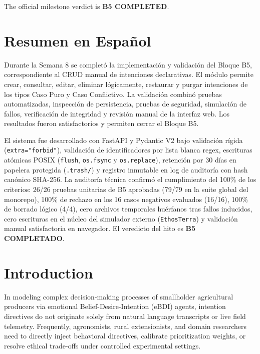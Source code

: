 \documentclass[11pt,a4paper]{article}
\begin{document}
The official milestone verdict is \textbf{B5 COMPLETED}.

\section{Resumen en Español}

Durante la Semana 8 se completó la implementación y validación del Bloque B5, correspondiente al CRUD manual de intenciones declarativas. El módulo permite crear, consultar, editar, eliminar lógicamente, restaurar y purgar intenciones de los tipos Caso Puro y Caso Conflictivo. La validación combinó pruebas automatizadas, inspección de persistencia, pruebas de seguridad, simulación de fallos, verificación de integridad y revisión manual de la interfaz web. Los resultados fueron satisfactorios y permiten cerrar el Bloque B5.

El sistema fue desarrollado con FastAPI y Pydantic V2 bajo validación rígida (\texttt{extra="forbid"}), validación de identificadores por lista blanca regex, escrituras atómicas POSIX (\texttt{flush}, \texttt{os.fsync} y \texttt{os.replace}), retención por 30 días en papelera protegida (\texttt{.trash/}) y registro inmutable en log de auditoría con hash canónico SHA-256. La auditoría técnica confirmó el cumplimiento del 100\% de los criterios: 26/26 pruebas unitarias de B5 aprobadas (79/79 en la suite global del monorepo), 100\% de rechazo en los 16 casos negativos evaluados (16/16), 100\% de borrado lógico (4/4), cero archivos temporales huérfanos tras fallos inducidos, cero escrituras en el núcleo del simulador externo (\texttt{EthosTerra}) y validación manual satisfactoria en navegador. El veredicto del hito es \textbf{B5 COMPLETADO}.

\section{Introduction}

In modeling complex decision-making processes of smallholder agricultural producers via emotional Belief-Desire-Intention (eBDI) agents, intention directives do not originate solely from natural language transcripts or live field telemetry. Frequently, agronomists, rural extensionists, and domain researchers need to directly inject behavioral directives, calibrate prioritization weights, or resolve ethical trade-offs under controlled experimental settings.
\end{document}
